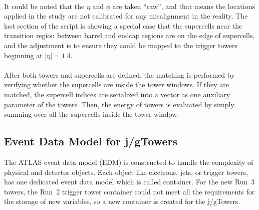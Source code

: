 \noindent
\\It could be noted that the $\eta$ and $\phi$ are taken ``raw'', and that means the locations applied in the study are not calibrated for any misalignment in the reality. The last section of the script is showing a special case that the supercells near the transition region between barrel and endcap regions are on the edge of supercells, and the adjustment is to ensure they could be mapped to the trigger towers beginning at $|\eta|=1.4$.
\\
\\After both towers and supercells are defined, the matching is performed by verifying whether the supercells are inside the tower windows. If they are matched, the supercell indices are serialized into a vector as one auxiliary parameter of the towers. Then, the energy of towers is evaluated by simply summing over all the supercells inside the tower window.
\subsection{Event Data Model for j/gTowers}
The ATLAS event data model\cite{Buckley:2015tjh} (EDM) is constructed to handle the complexity of physical and detector objects. Each object like electrons, jets, or trigger towers, has one dedicated event data model which is called container. For the new Run~3 towers, the Run~2 trigger tower container could not meet all the requirements for the storage of new variables, so a new container is created for the j/gTowers. 
